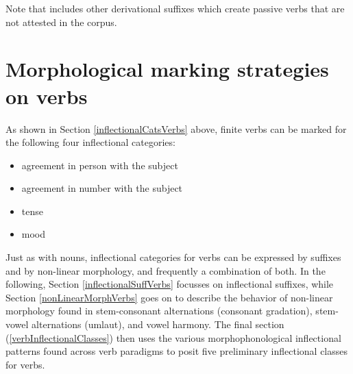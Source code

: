 Note that \citet{Ruong1945} includes other derivational suffixes which create passive verbs that are not attested in the corpus. 


\section{Morphological marking strategies on verbs}\label{markingVerbs}
As shown in Section \ref{inflectionalCatsVerbs} above, finite verbs can be marked for the following four inflectional categories: 
\begin{itemize}
\item{agreement in person with the subject}
\item{agreement in number with the subject}
\item{tense}
\item{mood}
\end{itemize}
Just as with nouns, inflectional categories for verbs can be expressed by suffixes and by non-linear morphology, and frequently a combination of both. In the following, Section \ref{inflectionalSuffVerbs} focusses on inflectional suffixes, while Section \ref{nonLinearMorphVerbs} goes on to describe the behavior of non-linear morphology found in stem-consonant alternations (consonant gradation), stem-vowel alternations (umlaut), %
and vowel harmony. The final section (\ref{verbInflectionalClasses}) then uses the various morphophonological inflectional patterns found across verb paradigms to posit five preliminary inflectional classes for verbs.


\newcommand{\Xp}[1]{\MC{1}{x{80pt}|}{#1}}%

